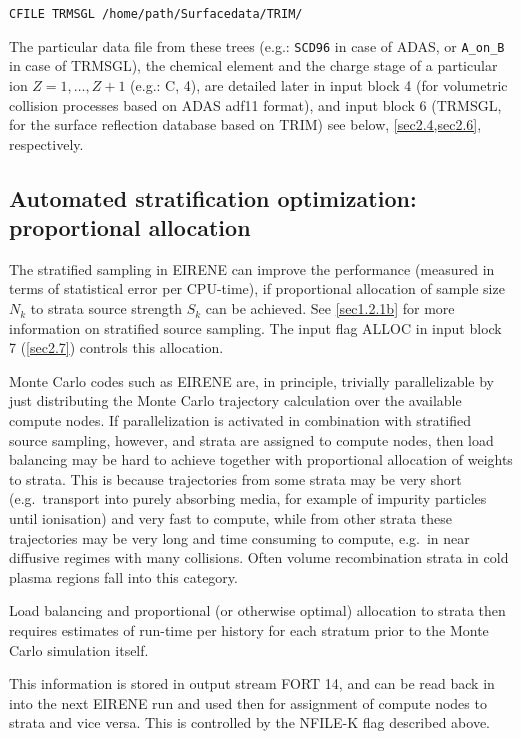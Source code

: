 \lstinline|CFILE TRMSGL /home/path/Surfacedata/TRIM/|

The particular data file from these trees (e.g.: \lstinline|SCD96| in case
of \ac{ADAS}, or \lstinline|A_on_B| in case of TRMSGL), the chemical
element  and the charge stage of a particular ion $Z = 1, \dots, Z+1$ (e.g.: C,
4), are detailed later in input block 4 (for volumetric collision processes
based on \ac{ADAS} adf11 format), and input block 6 (TRMSGL, for the surface
reflection database based on TRIM) see below, \cref{sec2.4,sec2.6},
respectively.

\subsection{Automated stratification optimization: proportional allocation}\label{NFILEK}

The stratified sampling in EIRENE can improve the performance (measured in
terms of statistical error per CPU-time), if proportional allocation of sample
size $N_k$ to strata source strength $S_k$ can be achieved.
See \cref{sec1.2.1b} for more information on stratified source sampling.
The input flag ALLOC in input block 7 (\cref{sec2.7}) controls this allocation.

Monte Carlo codes such as EIRENE are, in principle,  trivially parallelizable
by just distributing the Monte Carlo trajectory calculation over the available
compute nodes.
If parallelization is activated in combination with stratified source sampling,
however, and strata are assigned to compute nodes, then load balancing may be
hard to achieve together with proportional allocation of weights to strata.
This is because trajectories from some strata may be very short (e.g.\
transport into purely absorbing media, for example of impurity particles until
ionisation) and very fast to compute, while from other strata these
trajectories may be very long and time consuming to compute, e.g.\ in near
diffusive regimes with many collisions.
Often volume recombination strata in cold plasma regions fall into this
category.

Load balancing and proportional (or otherwise optimal) allocation to strata
then requires estimates of run-time per history for each stratum prior to the
Monte Carlo simulation itself.

This information is stored in output stream FORT 14, and can be read back in
into the next EIRENE run and used then for assignment of compute nodes to
strata and vice versa.
This is controlled by the NFILE-K flag described above.

